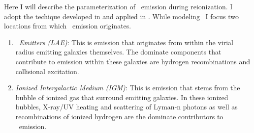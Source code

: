 Here I will describe the parameterization of \lya\ emission during reionization.
I adopt the techique developed in \cite{2013ApJ...763..132S} and applied in \cite{2017ApJ...848...52H}.
While modeling \lya\, I focus two locations from which \lya\ emission originates.

\begin{enumerate}
\item \textit{\lya\ Emitters (LAE)}: This is emission that originates from within the
              virial radius \lya\-emitting galaxies themselves. The dominate components
              that contribute to emission within these galaxies are hydrogen recombinations
              and collisional excitation.
\item \textit{Ionized Intergalactic Medium (IGM)}: This is emission that stems from the bubble
              of ionized gas that surround \lya\-emitting galaxies. In these ionized bubbles,
              X-ray/UV heating and scattering of Lyman-n photons as well as recombinations of
              ionized hydrogen are the dominate contributors to \lya\ emission.
\end{enumerate}
